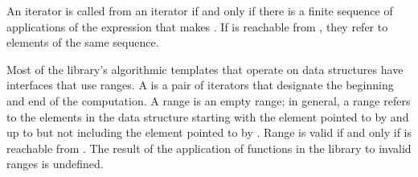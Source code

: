 \begin{removedblock}
\pnum
An iterator
is called
from an iterator
if and only if there is a finite sequence of applications of
the expression
that makes
.
If
is reachable from
,
they refer to elements of the same sequence.

\pnum
Most of the library's algorithmic templates that operate on data structures have interfaces that use ranges.
A
is a pair of iterators that designate the beginning and end of the computation.
A range 
is an empty range;
in general, a range 
refers to the elements in the data structure starting with the element
pointed to by
and up to but not including the element pointed to by
.
Range 
is valid if and only if
is reachable from
.
The result of the application of functions in the library to invalid ranges is
undefined.
\end{removedblock}

